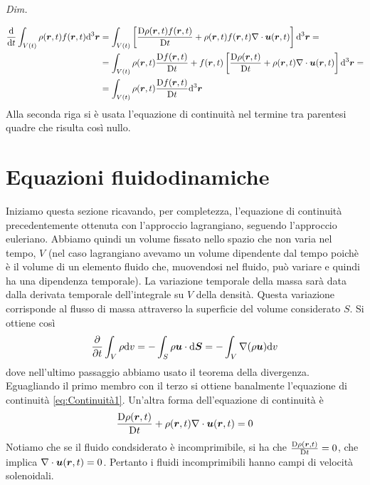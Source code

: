 \textit{Dim.}

\begin{align*}
\frac{\dd}{\dd t} \int_{V(t)} \rho(\V{r}, t) f(\V{r},t) \dd^3 \V{r} & = \int_{V(t)} \left[ \frac{\DD \rho(\V{r}, t) f(\V{r},t)}{\DD t} + \rho(\V{r}, t) f(\V{r},t) \V{\nabla}\cdot \V{u}(\V{r},t) \right] \dd^3 \V{r} = \\
& = \int_{V(t)} \rho(\V{r}, t) \frac{\DD  f(\V{r},t)}{\DD t} + f(\V{r},t) \left[ \frac{\DD  \rho(\V{r}, t)}{\DD t} + \rho(\V{r}, t) \V{\nabla}\cdot \V{u}(\V{r},t) \right] \dd^3 \V{r} = \\
& = \int_{V(t)} \rho(\V{r}, t) \frac{\DD f(\V{r},t)}{\DD t} \dd^3 \V{r}
\end{align*}
Alla seconda riga si è usata l'equazione di continuità nel termine tra parentesi quadre che risulta così nullo.

\section{Equazioni fluidodinamiche}
Iniziamo questa sezione ricavando, per completezza, l'equazione di continuità precedentemente ottenuta con l'approccio lagrangiano, seguendo l'approccio euleriano. Abbiamo quindi un volume fissato nello spazio che non varia nel tempo, $V$ (nel caso lagrangiano avevamo un volume dipendente dal tempo poichè è il volume di un elemento fluido che, muovendosi nel fluido, può variare e quindi ha una dipendenza temporale). La variazione temporale della massa sarà data dalla derivata temporale dell'integrale su $V$ della densità. Questa variazione corrisponde al flusso di massa attraverso la superficie del volume considerato $S$. Si ottiene così
\begin{equation}
\frac{\partial}{\partial t} \int_V \rho \dd v = - \int_S \rho \V{u} \cdot \dd \V{S} = -\int_V \V{\nabla}(\rho \V{u}) \dd v
\end{equation}
dove nell'ultimo passaggio abbiamo usato il teorema della divergenza. Eguagliando il primo membro con il terzo si ottiene banalmente l'equazione di continuità \ref{eq:Continuità1}. Un'altra forma dell'equazione di continuità è 
\begin{equation}
\frac{\DD \rho(\V{r}, t)}{\DD t} + \rho(\V{r}, t)\V{\nabla} \cdot \V{u}(\V{r}, t) = 0 \label{eq:Continuità2}
\end{equation}
Notiamo che se il fluido condsiderato è incomprimibile, si ha che $\frac{\DD \rho(\V{r}, t)}{\DD t}=0$, che implica $\V{\nabla} \cdot \V{u}(\V{r}, t) = 0$. Pertanto i fluidi incomprimibili hanno campi di velocità solenoidali.

